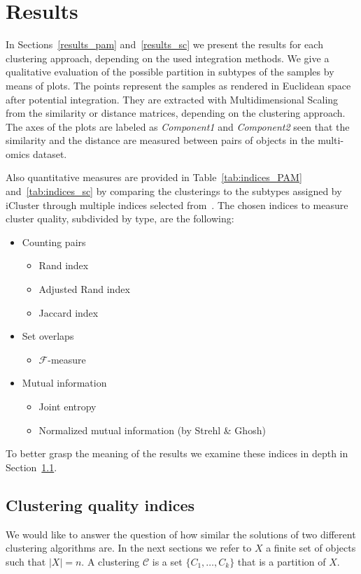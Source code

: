 \chapter{Results}

In Sections~\ref{results_pam} and~\ref{results_sc} we present the results for each clustering approach, depending on the used integration methods. We give a qualitative evaluation of the possible partition in subtypes of the samples by means of plots. The points represent the samples as rendered in Euclidean space after potential integration. They are extracted with Multidimensional Scaling from the similarity or distance matrices, depending on the clustering approach. The axes of the plots are labeled as \textit{Component1} and \textit{Component2} seen that the similarity and the distance are measured between pairs of objects in the multi-omics dataset.

Also quantitative measures are provided in Table~\ref{tab:indices_PAM} and~\ref{tab:indices_sc} by comparing the clusterings to the subtypes assigned by iCluster through multiple indices selected from~\cite{wagner2007comparing}. The chosen indices to measure cluster quality, subdivided by type, are the following:
\begin{itemize}
    \item Counting pairs
    \begin{itemize}             
        \item Rand index
        \item Adjusted Rand index
        \item Jaccard index
    \end{itemize}
    \item Set overlaps
    \begin{itemize}
        \item $\mathcal{F}$-measure
    \end{itemize}
    \item Mutual information
    \begin{itemize}
        \item Joint entropy
        \item Normalized mutual information (by Strehl \& Ghosh)
    \end{itemize}
\end{itemize}
To better grasp the meaning of the results we examine these indices in depth in Section~\ref{results_indices}.

\section{Clustering quality indices}\label{results_indices}
We would like to answer the question of how similar the solutions of two different clustering algorithms are. In the next sections we refer to $X$ a finite set of objects such that $|X|=n$. A clustering $\mathcal{C}$ is a set $\{C_1,\dots,C_k\}$ that is a partition of $X$.

